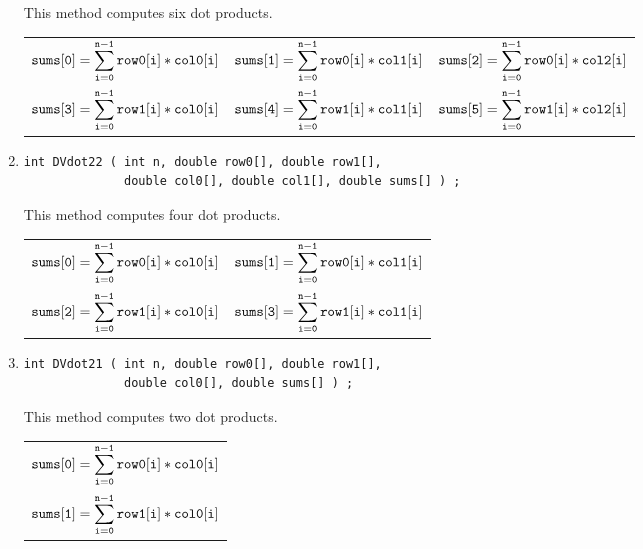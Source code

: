 \begin{enumerate}
This method computes six dot products.
\par
\begin{tabular}{lll}
$\displaystyle{\tt sums[0]}
               = \sum_{\tt i = 0}^{\tt n-1} {\tt row0[i] * col0[i]}$ &
$\displaystyle{\tt sums[1]}
               = \sum_{\tt i = 0}^{\tt n-1} {\tt row0[i] * col1[i]}$ &
$\displaystyle{\tt sums[2]}
               = \sum_{\tt i = 0}^{\tt n-1} {\tt row0[i] * col2[i]}$ \\
$\displaystyle{\tt sums[3]}
               = \sum_{\tt i = 0}^{\tt n-1} {\tt row1[i] * col0[i]}$ &
$\displaystyle{\tt sums[4]}
               = \sum_{\tt i = 0}^{\tt n-1} {\tt row1[i] * col1[i]}$ &
$\displaystyle{\tt sums[5]}
               = \sum_{\tt i = 0}^{\tt n-1} {\tt row1[i] * col2[i]}$ 
\end{tabular}
\item
\begin{verbatim}
int DVdot22 ( int n, double row0[], double row1[], 
              double col0[], double col1[], double sums[] ) ;
\end{verbatim}
This method computes four dot products.
\par
\begin{tabular}{ll}
$\displaystyle{\tt sums[0]}
               = \sum_{\tt i = 0}^{\tt n-1} {\tt row0[i] * col0[i]}$ &
$\displaystyle{\tt sums[1]}
               = \sum_{\tt i = 0}^{\tt n-1} {\tt row0[i] * col1[i]}$ \\
$\displaystyle{\tt sums[2]}
               = \sum_{\tt i = 0}^{\tt n-1} {\tt row1[i] * col0[i]}$ &
$\displaystyle{\tt sums[3]}
               = \sum_{\tt i = 0}^{\tt n-1} {\tt row1[i] * col1[i]}$ 
\end{tabular}
\item
\begin{verbatim}
int DVdot21 ( int n, double row0[], double row1[], 
              double col0[], double sums[] ) ;
\end{verbatim}
This method computes two dot products.
\par
\begin{tabular}{l}
$\displaystyle{\tt sums[0]}
               = \sum_{\tt i = 0}^{\tt n-1} {\tt row0[i] * col0[i]}$ \\
$\displaystyle{\tt sums[1]}
               = \sum_{\tt i = 0}^{\tt n-1} {\tt row1[i] * col0[i]}$ 

\end{tabular}
\end{enumerate}
